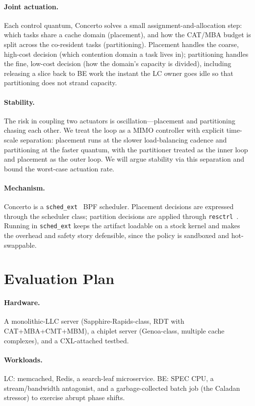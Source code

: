 \documentclass[sigconf,nonacm]{acmart}
\begin{document}
\paragraph{Joint actuation.}
Each control quantum, Concerto solves a small assignment-and-allocation step:
which tasks share a cache domain (placement), and how the CAT/MBA budget is split
across the co-resident tasks (partitioning). Placement handles the coarse,
high-cost decision (which contention domain a task lives in); partitioning
handles the fine, low-cost decision (how the domain's capacity is divided),
including releasing a slice back to BE work the instant the LC owner goes idle so
that partitioning does not strand capacity.

\paragraph{Stability.}
The risk in coupling two actuators is oscillation---placement and partitioning
chasing each other. We treat the loop as a MIMO controller with explicit
time-scale separation: placement runs at the slower load-balancing cadence and
partitioning at the faster quantum, with the partitioner treated as the inner
loop and placement as the outer loop. We will argue stability via this
separation and bound the worst-case actuation rate.

\paragraph{Mechanism.}
Concerto is a \texttt{sched\_ext}~\cite{linux-schedext} BPF scheduler. Placement
decisions are expressed through the scheduler class; partition decisions are
applied through \texttt{resctrl}~\cite{linux-resctrl}. Running in
\texttt{sched\_ext} keeps the artifact loadable on a stock kernel and makes the
overhead and safety story defensible, since the policy is sandboxed and
hot-swappable.

\section{Evaluation Plan}
\paragraph{Hardware.} A monolithic-LLC server (Sapphire-Rapids-class, RDT with
CAT+MBA+CMT+MBM), a chiplet server (Genoa-class, multiple cache complexes), and a
CXL-attached testbed.

\paragraph{Workloads.} LC: memcached, Redis, a search-leaf microservice. BE:
SPEC CPU, a stream/bandwidth antagonist, and a garbage-collected batch job (the
Caladan stressor) to exercise abrupt phase shifts.
\end{document}
